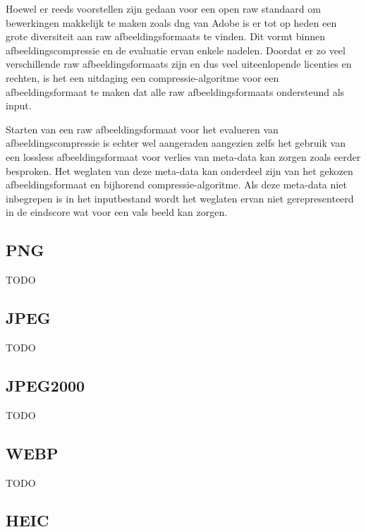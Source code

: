 Hoewel er reeds voorstellen zijn gedaan voor een open \gls{raw} standaard om bewerkingen makkelijk te maken zoals \gls{dng} van Adobe is er tot op heden een grote diversiteit aan \gls{raw} \glspl{afbeeldingsformaat} te vinden. Dit vormt binnen \gls{afbeeldingscompressie} en de evaluatie ervan enkele nadelen. Doordat er zo veel verschillende \gls{raw} \glspl{afbeeldingsformaat} zijn en dus veel uiteenlopende licenties en rechten, is het een uitdaging een \gls{compressie-algoritme} voor een \gls{afbeeldingsformaat} te maken dat alle \gls{raw} \glspl{afbeeldingsformaat} ondersteund als input. 

Starten van een \gls{raw} \gls{afbeeldingsformaat} voor het evalueren van \gls{afbeeldingscompressie} is echter wel aangeraden aangezien zelfs het gebruik van een \gls{lossless} \gls{afbeeldingsformaat} voor verlies van \gls{meta-data} kan zorgen zoals eerder besproken. Het weglaten van deze \gls{meta-data} kan onderdeel zijn van het gekozen \gls{afbeeldingsformaat} en bijhorend \gls{compressie-algoritme}. Als deze \gls{meta-data} niet inbegrepen is in het inputbestand wordt het weglaten ervan niet gerepresenteerd in de eindscore wat voor een vals beeld kan zorgen.

\subsection{PNG}
\label{sec:afbeeldingscompressie-png}

TODO

\subsection{JPEG}
\label{sec:afbeeldingscompressie-jpeg}

TODO

\subsection{JPEG2000}
\label{sec:afbeeldingscompressie-jpeg2000}

TODO

\subsection{WEBP}
\label{sec:afbeeldingscompressie-webp}

TODO

\subsection{HEIC}
\label{sec:afbeeldingscompressie-heic}

